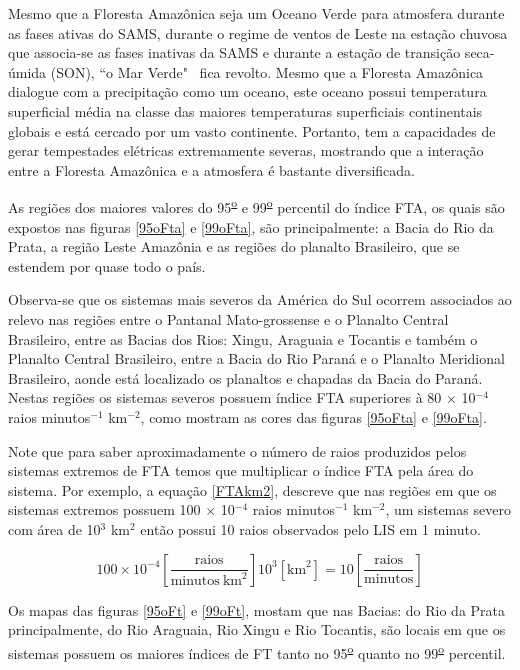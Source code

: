 Mesmo que a Floresta Amazônica seja um Oceano Verde para atmosfera durante as fases ativas do SAMS, durante o regime de ventos de Leste na estação chuvosa que associa-se as fases inativas da SAMS e durante a estação de transição seca-úmida (SON), ``o Mar Verde"  ~fica revolto. Mesmo que a Floresta Amazônica dialogue com a precipitação como um oceano, este oceano possui temperatura superficial média na classe das maiores temperaturas superficiais continentais globais e está cercado por um vasto continente. Portanto, tem a capacidades de gerar tempestades elétricas extremamente severas, mostrando que a interação entre a Floresta Amazônica e a atmosfera é bastante diversificada.

As regiões dos maiores valores do 95\textsuperscript{\underline{o}} e 99\textsuperscript{\underline{o}} percentil do índice FTA, os quais são  expostos nas figuras \ref{95oFta} e \ref{99oFta}, são principalmente: a Bacia do Rio da Prata, a região Leste Amazônia e as regiões  do planalto Brasileiro, que se estendem por quase todo o país.

Observa-se que os sistemas mais severos da América do Sul ocorrem associados ao relevo nas regiões entre o Pantanal Mato-grossense e o Planalto Central Brasileiro, entre as Bacias dos Rios: Xingu, Araguaia e Tocantis e também o Planalto Central Brasileiro, entre a Bacia do Rio Paraná e o Planalto Meridional Brasileiro, aonde está localizado os planaltos e chapadas da Bacia do Paraná. Nestas regiões os sistemas severos possuem índice FTA superiores à 80 $\times$ 10$^{-4}$ raios minutos$^{-1}$ km$^{-2}$, como mostram as cores das figuras \ref{95oFta} e \ref{99oFta}. 

Note que para saber aproximadamente o número de raios produzidos pelos sistemas extremos de FTA temos que multiplicar o índice FTA pela área do sistema. Por exemplo, a equação \ref{FTAkm2}, descreve que nas regiões em que os sistemas extremos possuem 100 $\times$ 10$^{-4}$ raios minutos$^{-1}$ km$^{-2}$, um sistemas severo com área de 10$^3$ km$^2$ então possui 10 raios observados pelo LIS em 1 minuto.  

\begin{equation}
100 \times 10^{-4} \left[ \frac{\mathrm{raios}}{\mathrm{minutos}~\mathrm{km}^2} \right]  10^3 [ \mathrm{km}^2 ] = 10 \left[ \frac{\mathrm{raios}}{\mathrm{minutos}}\right]  
\label{FTAkm2}
\end{equation}

Os mapas das figuras \ref{95oFt} e \ref{99oFt}, mostam que nas Bacias: do Rio da Prata principalmente, do Rio Araguaia, Rio Xingu e Rio Tocantis, são locais em que os sistemas possuem os maiores índices de FT tanto no 95\textsuperscript{\underline{o}} quanto no 99\textsuperscript{\underline{o}} percentil.

